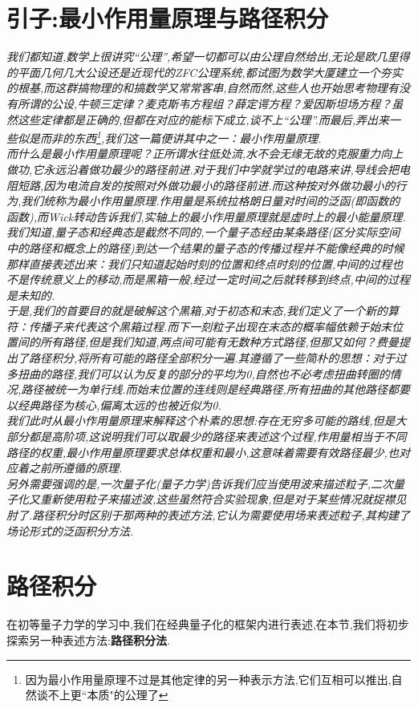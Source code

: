 \section*{引子:最小作用量原理与路径积分}
\textit{我们都知道,数学上很讲究“公理”,希望一切都可以由公理自然给出,无论是欧几里得的平面几何几大公设还是近现代的ZFC公理系统,都试图为数学大厦建立一个夯实的根基,而这群搞物理的和搞数学又常常客串,自然而然,这些人也开始思考物理有没有所谓的公设,牛顿三定律？麦克斯韦方程组？薛定谔方程？爱因斯坦场方程？虽然这些定律都是正确的,但都在对应的能标下成立,谈不上“公理”.而最后,弄出来一些似是而非的东西\footnote{因为最小作用量原理不过是其他定律的另一种表示方法,它们互相可以推出,自然谈不上更``本质"的公理了},我们这一篇便讲其中之一：最小作用量原理.\\
而什么是最小作用量原理呢？正所谓水往低处流,水不会无缘无故的克服重力向上做功,它永远沿着做功最少的路径前进.对于我们中学就学过的电路来讲,导线会把电阻短路,因为电流自发的按照对外做功最小的路径前进.而这种按对外做功最小的行为,我们统称为最小作用量原理.作用量是系统拉格朗日量对时间的泛函(即函数的函数),而Wick转动告诉我们,实轴上的最小作用量原理就是虚时上的最小能量原理.\\
我们知道,量子态和经典态是截然不同的,一个量子态经由某条路径(区分实际空间中的路径和概念上的路径)到达一个结果的量子态的传播过程并不能像经典的时候那样直接表述出来：我们只知道起始时刻的位置和终点时刻的位置,中间的过程也不是传统意义上的移动,而是黑箱一般,经过一定时间之后就转移到终点,中间的过程是未知的.\\
于是,我们的首要目的就是破解这个黑箱,对于初态和末态,我们定义了一个新的算符：传播子来代表这个黑箱过程.而下一刻粒子出现在末态的概率幅依赖于始末位置间的所有路径,但是我们知道,两点间可能有无数种方式路径,但那又如何？费曼提出了路径积分,将所有可能的路径全部积分一遍.其遵循了一些简朴的思想：对于过多扭曲的路径,我们可以认为反复的部分的平均为0,自然也不必考虑扭曲转圈的情况,路径被统一为单行线.而始末位置的连线则是经典路径,所有扭曲的其他路径都要以经典路径为核心,偏离太远的也被近似为0.\\
我们此时从最小作用量原理来解释这个朴素的思想:存在无穷多可能的路线,但是大部分都是高阶项,这说明我们可以取最少的路径来表述这个过程,作用量相当于不同路径的权重,最小作用量原理要求总体权重和最小,这意味着需要有效路径最少,也对应着之前所遵循的原理.\\
另外需要强调的是,一次量子化(量子力学)告诉我们应当使用波来描述粒子,二次量子化又重新使用粒子来描述波,这些虽然符合实验现象,但是对于某些情况就捉襟见肘了.路径积分时区别于那两种的表述方法,它认为需要使用场来表述粒子,其构建了场论形式的泛函积分方法.}
\section{路径积分}
在初等量子力学的学习中,我们在经典量子化的框架内进行表述,在本节,我们将初步探索另一种表述方法:\textbf{路径积分法}.
